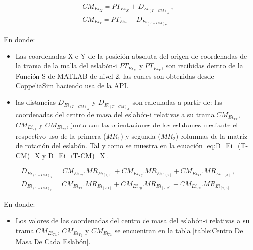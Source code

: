 \documentclass{article}
\begin{document}
\begin{sloppypar}
\begin{subequations} \label{eq:CM_Ei_X y CM_Ei_Y}
	\begin{align}
        \label{eq:CM_Ei_X}   CM_{Ei_X}=PT_{Ei_X}+D_{Ei_{(T-CM)_X}} \,,\\
        \label{eq:CM_Ei_Y}   CM_{Ei_Y}=PT_{Ei_Y}+D_{Ei_{(T-CM)_Y}} \,
	\end{align}
\end{subequations}

En donde:
\begin{itemize}
    \item Las coordenadas X e Y de la posición absoluta del origen de coordenadas de la trama de la malla del eslabón-i $PT_{Ei_X}$ y $PT_{Ei_Y}$, son recibidas dentro de la Función S de MATLAB de nivel 2, las cuales son obtenidas desde CoppeliaSim haciendo usa de la API.
    \item las distancias $D_{Ei_{(T-CM)_X}}$ y $D_{Ei_{(T-CM)_X}}$ son calculadas a partir de: las coordenadas del centro de masa del eslabón-i relativas a su trama $CM_{Ei_{Tx}}$, $CM_{Ei_{Ty}}$ y $CM_{Ei_{Tz}}$, junto con las orientaciones de los eslabones mediante el respectivo uso de la primera ($MR_1$) y segunda ($MR_2$) columnas de la matriz de rotación del eslabón. Tal y como se muestra en la ecuación \ref{eq:D_Ei_(T-CM)_X y D_Ei_(T-CM)_X}.
\end{itemize}

\begin{subequations} \label{eq:D_Ei_(T-CM)_X y D_Ei_(T-CM)_X}
	\begin{align}
        D_{Ei_{(T-CM)_X}} = CM_{Ei_{Tx}}.MR_{Ei_{[1,1]}} + CM_{Ei_{Ty}}.MR_{Ei_{[1,2]}} + CM_{Ei_{Tz}}.MR_{Ei_{[1,3]}} \,,
        \\
        D_{Ei_{(T-CM)_Y}} = CM_{Ei_{Tx}}.MR_{Ei_{[2,1]}} + CM_{Ei_{Ty}}.MR_{Ei_{[2,2]}} + CM_{Ei_{Tz}}.MR_{Ei_{[2,3]}} \,
    \end{align}
\end{subequations}

En donde:
\begin{itemize}
    \item Los valores de las coordenadas del centro de masa del eslabón-i relativas a su trama $CM_{Ei_{Tx}}$, $CM_{Ei_{Ty}}$ y $CM_{Ei_{Tz}}$ se encuentran en la tabla \ref{table:Centro De Masa De Cada Eslabón}.
\end{itemize}


\end{sloppypar}
\end{document}
